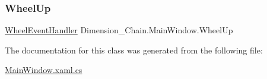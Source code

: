 \subsubsection{\texorpdfstring{Wheel\+Up}{WheelUp}}
{\footnotesize\ttfamily \mbox{\hyperlink{class_dimension___chain_1_1_main_window_ad49f6daca6cd98a445ca9d17d46b04ee}{Wheel\+Event\+Handler}} Dimension\+\_\+\+Chain.\+Main\+Window.\+Wheel\+Up\hspace{0.3cm}{\ttfamily [static]}}



The documentation for this class was generated from the following file\+:\begin{DoxyCompactItemize}
\item 
\mbox{\hyperlink{_main_window_8xaml_8cs}{Main\+Window.\+xaml.\+cs}}\end{DoxyCompactItemize}

